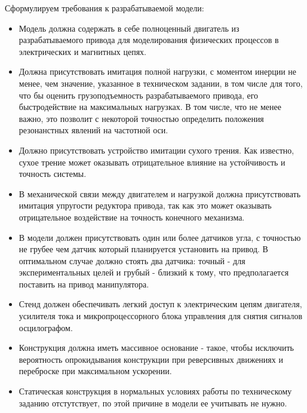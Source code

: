 Сформулируем требования к разрабатываемой модели:
\begin{itemize}
    \item Модель должна содержать в себе полноценный двигатель из разрабатываемого
    привода для моделирования физических процессов в электрических и магнитных цепях.

    \item Должна присутствовать имитация полной нагрузки, с моментом инерции не менее, чем
    значение, указанное в техническом задании, в том числе для того, что бы оценить
    грузоподъемность разрабатываемого привода, его быстродействие на максимальных
    нагрузках. В том числе, что не менее важно, это позволит с некоторой точностью
    определить положения резонанстных явлений на частотной оси.

    \item Должно присутствовать устройство имитации сухого трения. Как
    известно, сухое трение может оказывать отрицательное влияние на устойчивость
    и точность системы.

    \item В механической связи между двигателем и нагрузкой должна присутствовать имитация
    упругости редуктора привода, так как это может оказывать отрицательное воздействие
    на точность конечного механизма.

    \item В модели должен присутствовать один или более датчиков угла, с точностью не
    грубее чем датчик который планируется установить на привод. В оптимальном случае должно
    стоять два датчика: точный - для экспериментальных целей и грубый - близкий
    к тому, что предполагается поставить на привод манипулятора.

    \item Стенд должен обеспечивать легкий доступ к электрическим цепям двигателя,
    усилителя тока и микропроцессорного блока управления для снятия сигналов
    осцилографом.

    \item Конструкция должна иметь массивное основание - такое, чтобы
    исключить вероятность опрокидывания конструкции при реверсивных движениях
    и переброске при максимальном ускорении.

    \item Статическая конструкция в нормальных условиях работы по техническому
    заданию отстутствует, по этой причине в модели ее учитывать не нужно.
\end{itemize}

\endinput

